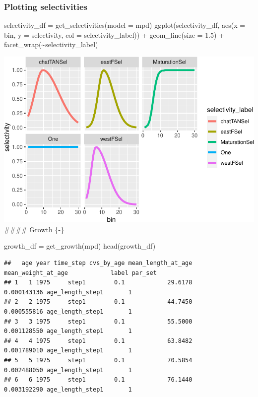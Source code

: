 \documentclass[
]{book}
\newenvironment{Shaded}{\begin{snugshade}}{\end{snugshade}}
\newcommand{\AttributeTok}[1]{\textcolor[rgb]{0.77,0.63,0.00}{#1}}
\newcommand{\FloatTok}[1]{\textcolor[rgb]{0.00,0.00,0.81}{#1}}
\newcommand{\FunctionTok}[1]{\textcolor[rgb]{0.00,0.00,0.00}{#1}}
\newcommand{\NormalTok}[1]{#1}
\newcommand{\OtherTok}[1]{\textcolor[rgb]{0.56,0.35,0.01}{#1}}
\newcommand{\SpecialCharTok}[1]{\textcolor[rgb]{0.00,0.00,0.00}{#1}}
\begin{document}
\hypertarget{plotting-selectivities}{%
\subsubsection{Plotting selectivities}\label{plotting-selectivities}}

\begin{Shaded}
\begin{Highlighting}[]
\NormalTok{selectivity\_df }\OtherTok{=} \FunctionTok{get\_selectivities}\NormalTok{(}\AttributeTok{model =}\NormalTok{ mpd)}
\FunctionTok{ggplot}\NormalTok{(selectivity\_df, }\FunctionTok{aes}\NormalTok{(}\AttributeTok{x =}\NormalTok{ bin, }\AttributeTok{y =}\NormalTok{ selectivity, }\AttributeTok{col =}\NormalTok{ selectivity\_label)) }\SpecialCharTok{+}
  \FunctionTok{geom\_line}\NormalTok{(}\AttributeTok{size =} \FloatTok{1.5}\NormalTok{) }\SpecialCharTok{+}
  \FunctionTok{facet\_wrap}\NormalTok{(}\SpecialCharTok{\textasciitilde{}}\NormalTok{selectivity\_label)}
\end{Highlighting}
\end{Shaded}

\includegraphics{_main_files/figure-latex/selectivities_mpd-1.pdf}
\#\#\#\# Growth \{-\}

\begin{Shaded}
\begin{Highlighting}[]
\NormalTok{growth\_df }\OtherTok{=} \FunctionTok{get\_growth}\NormalTok{(mpd)}
\FunctionTok{head}\NormalTok{(growth\_df)}
\end{Highlighting}
\end{Shaded}

\begin{verbatim}
##   age year time_step cvs_by_age mean_length_at_age mean_weight_at_age            label par_set
## 1   1 1975     step1        0.1            29.6178        0.000143136 age_length_step1       1
## 2   2 1975     step1        0.1            44.7450        0.000555816 age_length_step1       1
## 3   3 1975     step1        0.1            55.5000        0.001128550 age_length_step1       1
## 4   4 1975     step1        0.1            63.8482        0.001789010 age_length_step1       1
## 5   5 1975     step1        0.1            70.5854        0.002488050 age_length_step1       1
## 6   6 1975     step1        0.1            76.1440        0.003192290 age_length_step1       1
\end{verbatim}
\end{document}
